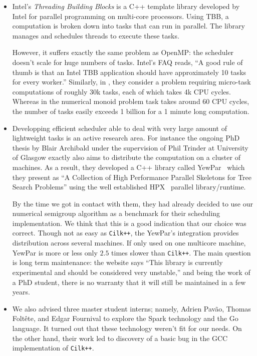 \documentclass{deliverablereport}
\newcommand{\CilkP}{\texttt{Cilk++}\xspace}
\begin{document}
\begin{itemize}
  Unfortunately, for computations like numerical semigroups, there
  is a huge number of small tasks that are spawned. We used the implementation
  from the GCC compiler. At the time of our experiment, we found that the
  scheduler doesn't scale to this huge number of tasks required. The scheduling overhead
  was several order of magnitude larger than \CilkP making it unusable for
  these kinds of computations.

\item Intel's \emph{Threading Building Blocks} is a C++ template library
  developed by Intel for parallel programming on multi-core processors. Using
  TBB, a computation is broken down into tasks that can run in parallel. The
  library manages and schedules threads to execute these tasks.

  However, it suffers exactly the same problem as OpenMP: the scheduler
  doesn't scale for huge numbers of tasks. Intel's FAQ reads, ``A good rule of
  thumb is that an Intel TBB application should have approximately 10 tasks
  for every worker.'' Similarly, in \cite{LuLi}, they consider a problem
  requiring micro-task computations of roughly 30k tasks, each of which takes 4k
  CPU cycles. Whereas in the numerical monoid problem task takes around 60
  CPU cycles, the number of tasks easily exceeds 1 billion for a 1 minute long
  computation.

\item Developping efficient scheduler able to deal with very large amount of
  lightweight tasks is an active research area. For instance the ongoing PhD
  thesis by Blair Archibald under the supervision of Phil Trinder at University
  of Glasgow exactly also aims to distribute the computation on a cluster
  of machines. As a result, they developed a C++ library called
  YewPar~\cite{YewPar} which they present as ``A Collection of High
  Performance Parallel Skeletons for Tree Search Problems'' using the well
  established HPX~\cite{HPX} parallel library/runtime.

  By the time we got in contact with them, they had already decided to use our numerical
  semigroup algorithm as a benchmark for their scheduling implementation. We
  think that this is a good indication that our choice was correct. Though not
  as easy as \CilkP, the YewPar's integration
  provides distribution across several machines. If only used on
  one multicore machine, YewPar is more or less only $2.5$ times slower than
  \CilkP. The main question is long term maintenance: the website says ``This
  library is currently experimental and should be considered very unstable,''
  and being the work of a PhD student, there is no warranty that it will
  still be maintained in a few years.

\item We also advised three master student interns; namely, Adrien Pavão,
  Thomas Foltête, and Edgar Fournival to explore the Spark technology and the
  Go language. It turned out that these technology weren't fit for our
  needs. On the other hand, their work led to discovery of a basic bug in the GCC
  implementation of \CilkP \cite{gcc-bug-80038}.
\end{itemize}
\end{document}
